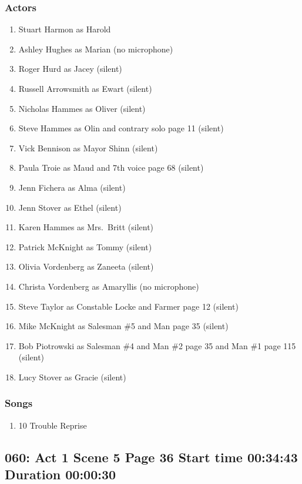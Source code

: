 \subsubsection{Actors}
\begin{enumerate}
\item Stuart Harmon as Harold
\item Ashley Hughes as Marian (no microphone)
\item Roger Hurd as Jacey (silent)
\item Russell Arrowsmith as Ewart (silent)
\item Nicholas Hammes as Oliver (silent)
\item Steve Hammes as Olin and contrary solo page 11 (silent)
\item Vick Bennison as Mayor Shinn (silent)
\item Paula Troie as Maud and 7th voice page 68 (silent)
\item Jenn Fichera as Alma (silent)
\item Jenn Stover as Ethel (silent)
\item Karen Hammes as Mrs.~Britt (silent)
\item Patrick McKnight as Tommy (silent)
\item Olivia Vordenberg as Zaneeta (silent)
\item Christa Vordenberg as Amaryllis (no microphone)
\item Steve Taylor as Constable Locke and Farmer page 12 (silent)
\item Mike McKnight as Salesman \#5 and Man page 35 (silent)
\item Bob Piotrowski as Salesman \#4 and Man \#2 page 35 and Man \#1 page 115 (silent)
\item Lucy Stover as Gracie (silent)
\end{enumerate}

\subsubsection{Songs}
\begin{enumerate}
\item 10 Trouble Reprise
\end{enumerate}
\subsection{060: Act 1 Scene 5 Page 36 Start time 00:34:43 Duration 00:00:30}

